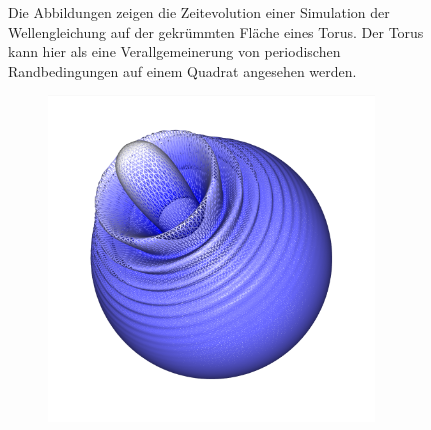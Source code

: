 \documentclass[crop=false]{standalone}
\begin{document}
\begin{figure}[h]
\begin{subfigure}[b]{0.24\textwidth}
        \caption{}
      \end{subfigure}
      \caption[Wellensimulation auf einem Torus]{%
        Die Abbildungen zeigen die Zeitevolution einer Simulation der Wellengleichung auf der gekrümmten Fläche eines Torus.
        Der Torus kann hier als eine Verallgemeinerung von periodischen Randbedingungen auf einem Quadrat angesehen werden.
      }
      \label{fig:torus-wave}
    \end{figure}

    \begin{figure}[h]
      \center
      \begin{subfigure}[b]{0.24\textwidth}
        \center
        \includegraphics[trim={2.12cm 2.33cm 2.2cm 0cm},clip,width=0.95\textwidth]{images/sphere_wave_0.png}
        \caption{}
      \end{subfigure}
      \begin{subfigure}[b]{0.24\textwidth}
        \center

\end{subfigure}
\end{figure}
\end{document}
